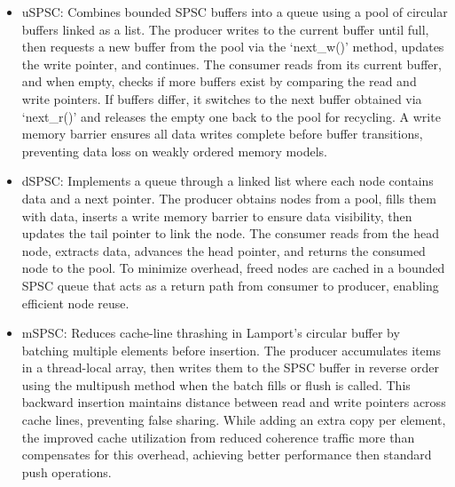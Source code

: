 \begin{itemize}
   \item \ac{uSPSC}: Combines bounded SPSC buffers into a queue using a pool of circular buffers linked as a list. The producer writes to the current buffer until full, then requests a new buffer from the pool via the \enquote*{next\_w()} method, updates the write pointer, and continues. The consumer reads from its current buffer, and when empty, checks if more buffers exist by comparing the read and write pointers. If buffers differ, it switches to the next buffer obtained via \enquote*{next\_r()} and releases the empty one back to the pool for recycling. A write memory barrier ensures all data writes complete before buffer transitions, preventing data loss on weakly ordered memory models. \cite{torquati2010singleproducersingleconsumerqueuessharedcache,Aldinucci2012EfficientSync}
   \item \ac{dSPSC}: Implements a queue through a linked list where each node contains data and a next pointer. The producer obtains nodes from a pool, fills them with data, inserts a write memory barrier to ensure data visibility, then updates the tail pointer to link the node. The consumer reads from the head node, extracts data, advances the head pointer, and returns the consumed node to the pool. To minimize overhead, freed nodes are cached in a bounded SPSC queue that acts as a return path from consumer to producer, enabling efficient node reuse. \cite{torquati2010singleproducersingleconsumerqueuessharedcache,Aldinucci2012EfficientSync}
   \item \ac{mSPSC}: Reduces cache-line thrashing in Lamport's circular buffer by batching multiple elements before insertion. The producer accumulates items in a thread-local array, then writes them to the SPSC buffer in reverse order using the multipush method when the batch fills or flush is called. This backward insertion maintains distance between read and write pointers across cache lines, preventing false sharing. While adding an extra copy per element, the improved cache utilization from reduced coherence traffic more than compensates for this overhead, achieving better performance then standard push operations. \cite{torquati2010singleproducersingleconsumerqueuessharedcache}
\end{itemize}

